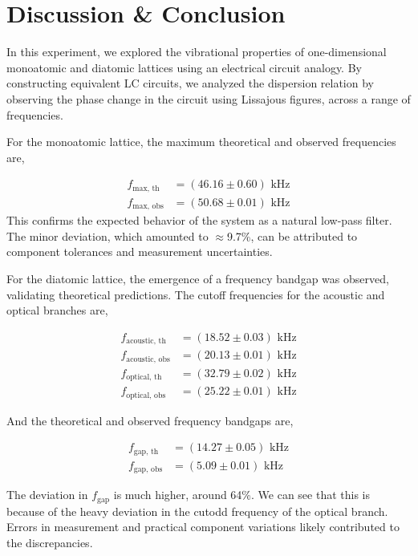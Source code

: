 \section{Discussion \& Conclusion}

In this experiment, we explored the vibrational properties of
one-dimensional monoatomic and diatomic lattices using
an electrical circuit analogy. By constructing equivalent
LC circuits, we analyzed the dispersion relation by observing the phase change in the circuit using Lissajous figures, across a range of frequencies.

For the monoatomic lattice, the maximum theoretical and observed frequencies are,

\begin{align*}
    f_\text{max, th} &= (46.16 \pm 0.60) \text{ kHz}\\
    f_\text{max, obs} &= (50.68 \pm 0.01) \text{ kHz}
\end{align*}
This confirms the expected behavior of the system as a natural low-pass filter. The minor
deviation, which amounted to $\approx$9.7\%, can be attributed to component tolerances and measurement uncertainties.

For the diatomic lattice, the emergence of a frequency bandgap was observed, validating theoretical predictions. 
The cutoff frequencies for the acoustic and optical branches are,

\begin{align*}
    f_\text{acoustic, th} &= (18.52 \pm 0.03) \text{ kHz}\\
    f_\text{acoustic, obs} &= (20.13 \pm 0.01) \text{ kHz}\\
    f_\text{optical, th} &= (32.79 \pm 0.02) \text{ kHz}\\
    f_\text{optical, obs} &= (25.22 \pm 0.01) \text{ kHz}
\end{align*}

And the theoretical and observed frequency bandgaps are,

\begin{align*}
    f_\text{gap, th} &= (14.27 \pm 0.05) \text{ kHz}\\
    f_\text{gap, obs} &= (5.09 \pm 0.01) \text{ kHz}
\end{align*}

The deviation in $f_\text{gap}$ is much higher, around 64\%. We can see that this is because of the heavy deviation in the cutodd frequency of the optical branch. Errors in measurement and
practical component variations likely contributed to the discrepancies.

